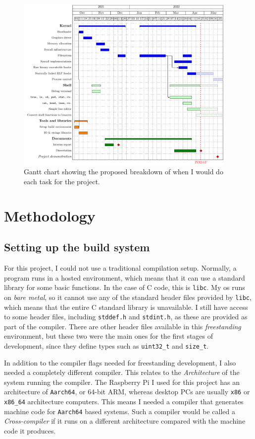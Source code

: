 \documentclass{article}
\begin{document}
\begin{figure}[htbp]
    \includegraphics[width=0.95\textwidth]{build/gantt.pdf}
    \caption{Gantt chart showing the proposed breakdown of when I would do each
    task for the project.}
    \label{fig:gantt-chart}
\end{figure}


\section{Methodology}
\subsection{Setting up the build system}
For this project, I could not use a traditional compilation setup. Normally, a
program runs in a hosted environment, which means that it can use a standard
library for some basic functions. In the case of C code, this is \texttt{libc}.
My \gls{os} runs on \emph{bare metal}, so it cannot use any of the standard
header files provided by \texttt{libc}, which means that the entire C standard
library is unavailable. I still have access to some header files, including
\texttt{stddef.h} and \texttt{stdint.h}, as these are provided as part of the
compiler. There are other header files available in this \emph{freestanding}
environment, but these two were the main ones for the first stages of
development, since they define types such as \texttt{uint32\_t} and
\texttt{size\_t}.

In addition to the compiler flags needed for freestanding development, I also
needed a completely different compiler. This relates to the \emph{Architecture}
of the system running the compiler. The Raspberry Pi I used for this project
has an architecture of \texttt{Aarch64}, or 64-bit ARM, whereas desktop PCs are
usually \texttt{x86} or \texttt{x86\_64} architecture computers. This means I
needed a compiler that generates machine code for \texttt{Aarch64} based
systems. Such a compiler would be called a \emph{Cross-compiler} if it runs on
a different architecture compared with the machine code it produces.
\end{document}
